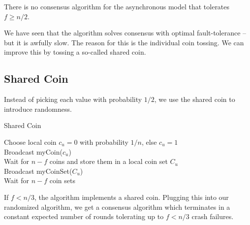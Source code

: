 There is no consensus algorithm for the asynchronous model that tolerates $f \geq n/2$. \medskip

We have seen that the algorithm solves consensus with optimal fault-tolerance – but it is awfully slow. The reason for this is the individual coin tossing. We can improve this by tossing a so-called shared coin.


\subsection{Shared Coin}

Instead of picking each value with probability $1/2$, we use the shared coin to introduce randomness. \medskip

\begin{algorithm}[H]
\caption{Shared Coin}
	Choose local coin $c_u = 0$ with probability $1/n$, else $c_u =1$ \\
	Broadcast myCoin($c_u$) \\
	
	\BlankLine
	Wait for $n-f$ coins and store them in a local coin set $C_u$ \\
	Broadcast myCoinSet($C_u$) \\
	
	\BlankLine
	Wait for $n-f$ coin sets \\
\end{algorithm}
\medskip

If $f < n/3$, the algorithm implements a shared coin. Plugging this into our randomized algorithm, we get a consensus algorithm which terminates in a constant expected number of rounds tolerating up to $f < n/3$ crash failures.
